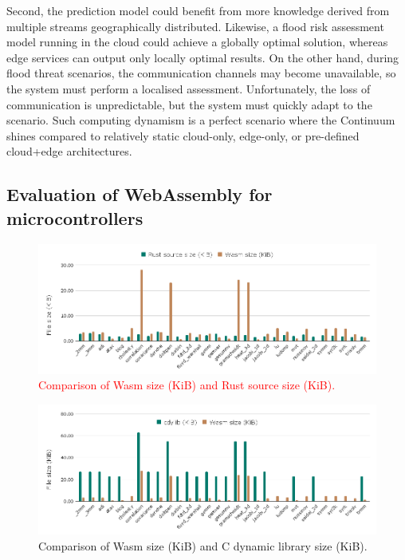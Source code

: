 Second, the prediction model could benefit from more knowledge derived from multiple streams geographically distributed. Likewise, a flood risk assessment model running in the cloud could achieve a globally optimal solution, whereas edge services can output only locally optimal results. On the other hand, during flood threat scenarios, the communication channels may become unavailable, so the system must perform a localised assessment. Unfortunately, the loss of communication is unpredictable, but the system must quickly adapt to the scenario. Such computing dynamism is a perfect scenario where the Continuum shines compared to relatively static cloud-only, edge-only, or pre-defined cloud+edge architectures.

\subsection{Evaluation of WebAssembly for microcontrollers}

\begin{figure}[ht]
\centering
\includegraphics[width=\columnwidth]{figures/b-wasmi-2}
\caption{\textcolor{red}{Comparison of Wasm size (KiB) and Rust source size (KiB).}}
\label{fig:b-wasmi-2}
\end{figure}

\begin{figure}[ht]
\centering
\includegraphics[width=\columnwidth]{figures/b-wasmi-3}
\caption{Comparison of Wasm size (KiB) and C dynamic library size (KiB).} \label{fig:b-wasmi-3}
\end{figure}

